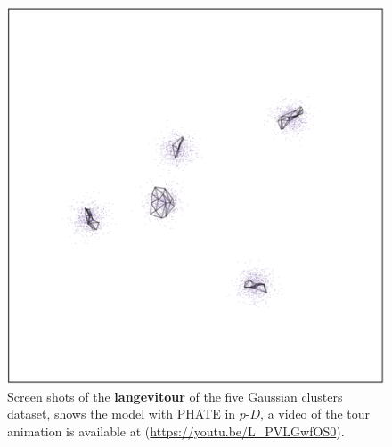 \documentclass[
  12pt]{article}
\newcommand\pD{$p\text{-}D$}
\begin{document}
\begin{figure}[H]
%
\begin{minipage}{0.33\linewidth}
\includegraphics{figures/five_gau_clusters/sc_phate_3.png}\end{minipage}%

\caption{\label{fig-gau3_sc}Screen shots of the \textbf{langevitour} of
the five Gaussian clusters dataset, shows the model with PHATE in \pD{},
a video of the tour animation is available at
(\url{https://youtu.be/L_PVLGwfOS0}).}

\end{figure}%
\end{document}
